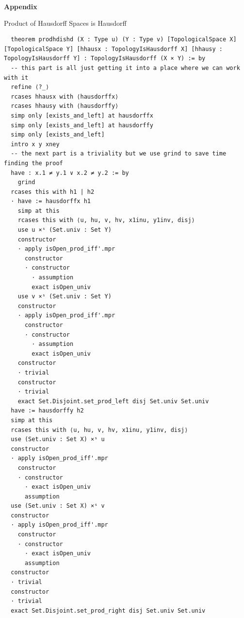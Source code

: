 \documentclass[11pt]{article}
\begin{document}
\newpage

\textbf{Appendix}

Product of Hausdorff Spaces is Hausdorff
\begin{verbatim}
  theorem prodhdishd (X : Type u) (Y : Type v) [TopologicalSpace X] [TopologicalSpace Y] [hhausx : TopologyIsHausdorff X] [hhausy : TopologyIsHausdorff Y] : TopologyIsHausdorff (X × Y) := by
  -- this part is all just getting it into a place where we can work with it
  refine ⟨?_⟩ 
  rcases hhausx with ⟨hausdorffx⟩
  rcases hhausy with ⟨hausdorffy⟩
  simp only [exists_and_left] at hausdorffx
  simp only [exists_and_left] at hausdorffy
  simp only [exists_and_left]
  intro x y xney
  -- the next part is a triviality but we use grind to save time finding the proof
  have : x.1 ≠ y.1 ∨ x.2 ≠ y.2 := by 
    grind
  rcases this with h1 | h2
  · have := hausdorffx h1  
    simp at this 
    rcases this with ⟨u, hu, v, hv, x1inu, y1inv, disj⟩
    use u ×ˢ (Set.univ : Set Y) 
    constructor
    · apply isOpen_prod_iff'.mpr
      constructor
      · constructor 
        · assumption
        exact isOpen_univ
    use v ×ˢ (Set.univ : Set Y)
    constructor
    · apply isOpen_prod_iff'.mpr
      constructor
      · constructor 
        · assumption
        exact isOpen_univ
    constructor
    · trivial 
    constructor
    · trivial
    exact Set.Disjoint.set_prod_left disj Set.univ Set.univ
  have := hausdorffy h2
  simp at this
  rcases this with ⟨u, hu, v, hv, x1inu, y1inv, disj⟩
  use (Set.univ : Set X) ×ˢ u
  constructor
  · apply isOpen_prod_iff'.mpr 
    constructor
    · constructor
      · exact isOpen_univ
      assumption
  use (Set.univ : Set X) ×ˢ v 
  constructor
  · apply isOpen_prod_iff'.mpr 
    constructor
    · constructor
      · exact isOpen_univ
      assumption
  constructor
  · trivial
  constructor
  · trivial
  exact Set.Disjoint.set_prod_right disj Set.univ Set.univ
\end{verbatim}

\end{document}
